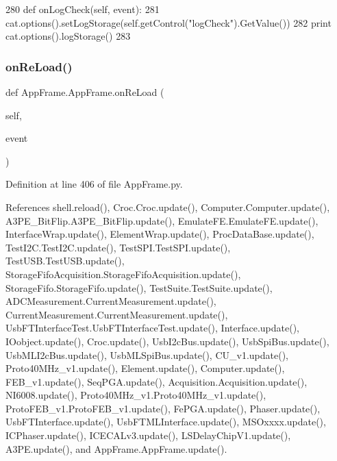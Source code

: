 \begin{DoxyCode}
280     \textcolor{keyword}{def }onLogCheck(self, event):
281         cat.options().setLogStorage(self.getControl(\textcolor{stringliteral}{"logCheck"}).GetValue())
282         \textcolor{keywordflow}{print} cat.options().logStorage()
283         
\end{DoxyCode}
\mbox{\label{classAppFrame_1_1AppFrame_a9ff1f12856ce454896ae7c965eef2ba3}} 
\subsubsection{\texorpdfstring{on\+Re\+Load()}{onReLoad()}}
{\footnotesize\ttfamily def App\+Frame.\+App\+Frame.\+on\+Re\+Load (\begin{DoxyParamCaption}\item[{}]{self,  }\item[{}]{event }\end{DoxyParamCaption})}



Definition at line 406 of file App\+Frame.\+py.



References shell.\+reload(), Croc.\+Croc.\+update(), Computer.\+Computer.\+update(), A3\+P\+E\+\_\+\+Bit\+Flip.\+A3\+P\+E\+\_\+\+Bit\+Flip.\+update(), Emulate\+F\+E.\+Emulate\+F\+E.\+update(), Interface\+Wrap.\+update(), Element\+Wrap.\+update(), Proc\+Data\+Base.\+update(), Test\+I2\+C.\+Test\+I2\+C.\+update(), Test\+S\+P\+I.\+Test\+S\+P\+I.\+update(), Test\+U\+S\+B.\+Test\+U\+S\+B.\+update(), Storage\+Fifo\+Acquisition.\+Storage\+Fifo\+Acquisition.\+update(), Storage\+Fifo.\+Storage\+Fifo.\+update(), Test\+Suite.\+Test\+Suite.\+update(), A\+D\+C\+Measurement.\+Current\+Measurement.\+update(), Current\+Measurement.\+Current\+Measurement.\+update(), Usb\+F\+T\+Interface\+Test.\+Usb\+F\+T\+Interface\+Test.\+update(), Interface.\+update(), I\+Oobject.\+update(), Croc.\+update(), Usb\+I2c\+Bus.\+update(), Usb\+Spi\+Bus.\+update(), Usb\+M\+L\+I2c\+Bus.\+update(), Usb\+M\+L\+Spi\+Bus.\+update(), C\+U\+\_\+v1.\+update(), Proto40\+M\+Hz\+\_\+v1.\+update(), Element.\+update(), Computer.\+update(), F\+E\+B\+\_\+v1.\+update(), Seq\+P\+G\+A.\+update(), Acquisition.\+Acquisition.\+update(), N\+I6008.\+update(), Proto40\+M\+Hz\+\_\+v1.\+Proto40\+M\+Hz\+\_\+v1.\+update(), Proto\+F\+E\+B\+\_\+v1.\+Proto\+F\+E\+B\+\_\+v1.\+update(), Fe\+P\+G\+A.\+update(), Phaser.\+update(), Usb\+F\+T\+Interface.\+update(), Usb\+F\+T\+M\+L\+Interface.\+update(), M\+S\+Oxxxx.\+update(), I\+C\+Phaser.\+update(), I\+C\+E\+C\+A\+Lv3.\+update(), L\+S\+Delay\+Chip\+V1.\+update(), A3\+P\+E.\+update(), and App\+Frame.\+App\+Frame.\+update().


